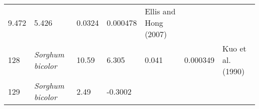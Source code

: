 \documentclass[]{article}
\begin{document}
\begin{longtable}[]{@{}lllllll@{}}
\begin{minipage}[t]{0.05\columnwidth}
9.472\strut
\end{minipage} & \begin{minipage}[t]{0.08\columnwidth}\raggedright
5.426\strut
\end{minipage} & \begin{minipage}[t]{0.08\columnwidth}\raggedright
0.0324\strut
\end{minipage} & \begin{minipage}[t]{0.08\columnwidth}\raggedright
0.000478\strut
\end{minipage} & \begin{minipage}[t]{0.23\columnwidth}\raggedright
Ellis and Hong (2007)\strut
\end{minipage}\tabularnewline
\begin{minipage}[t]{0.05\columnwidth}\raggedright
128\strut
\end{minipage} & \begin{minipage}[t]{0.23\columnwidth}\raggedright
\emph{Sorghum bicolor}\strut
\end{minipage} & \begin{minipage}[t]{0.05\columnwidth}\raggedright
10.59\strut
\end{minipage} & \begin{minipage}[t]{0.08\columnwidth}\raggedright
6.305\strut
\end{minipage} & \begin{minipage}[t]{0.08\columnwidth}\raggedright
0.041\strut
\end{minipage} & \begin{minipage}[t]{0.08\columnwidth}\raggedright
0.000349\strut
\end{minipage} & \begin{minipage}[t]{0.23\columnwidth}\raggedright
Kuo et al. (1990)\strut
\end{minipage}\tabularnewline
\begin{minipage}[t]{0.05\columnwidth}\raggedright
129\strut
\end{minipage} & \begin{minipage}[t]{0.23\columnwidth}\raggedright
\emph{Sorghum bicolor}\strut
\end{minipage} & \begin{minipage}[t]{0.05\columnwidth}\raggedright
2.49\strut
\end{minipage} & \begin{minipage}[t]{0.08\columnwidth}\raggedright
-0.3002\strut
\end{minipage} & \begin{minipage}[t]{0.08\columnwidth}\raggedright

\end{minipage}
\end{longtable}
\end{document}

